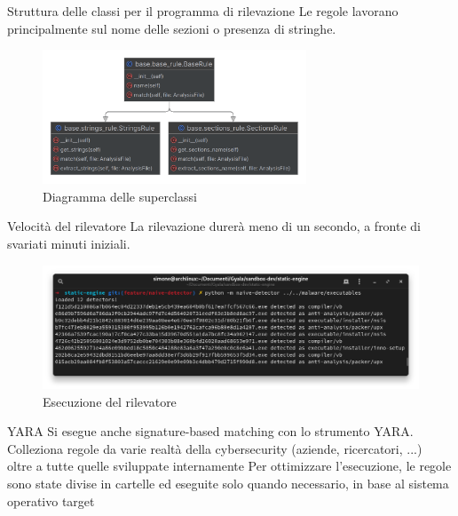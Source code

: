 \begin{frame}{Struttura delle classi per il programma di rilevazione}
Le regole lavorano principalmente sul nome delle sezioni o presenza di stringhe.

\begin{figure}
    \centering
    \includegraphics[width=0.7\textwidth]{images/base_custom_static_analyzer.png}
    \caption{Diagramma delle superclassi}
    \label{fig:base_custom_static_analyzer}
\end{figure}
\end{frame}

\begin{frame}{Velocità del rilevatore}
La rilevazione durerà meno di un secondo, a fronte di svariati minuti iniziali.

\begin{figure}
    \centering
    \includegraphics[width=\textwidth]{images/custom_file_detector_output.png}
    \caption{Esecuzione del rilevatore}
    \label{fig:custom_file_detector_output}
\end{figure}
\end{frame}

\begin{frame}{YARA}
Si esegue anche signature-based matching con lo strumento YARA.
\vfill
Colleziona regole da varie realtà della cybersecurity (aziende, ricercatori, ...) \\
oltre a tutte quelle sviluppate internamente
\vfill
Per ottimizzare l'esecuzione, le regole sono state divise in cartelle ed eseguite solo quando necessario, in base al sistema operativo target
\end{frame}

